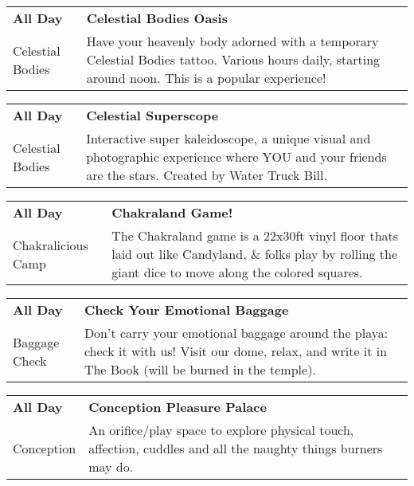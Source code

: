 \begin{tabular}{ p{1in} p{2.2in} }
    \textbf{All Day} & \textbf{Celestial Bodies Oasis} \\
    Celestial Bodies \newline  & Have your heavenly body adorned with a temporary Celestial Bodies tattoo. Various hours daily, starting around noon. This is a popular experience! \\
    \hline 
\end{tabular}
    
\begin{tabular}{ p{1in} p{2.2in} }
    \textbf{All Day} & \textbf{Celestial Superscope} \\
    Celestial Bodies \newline  & Interactive super kaleidoscope, a unique visual and photographic experience where YOU and your friends are the stars. Created by Water Truck Bill. \\
    \hline 
\end{tabular}
    
\begin{tabular}{ p{1in} p{2.2in} }
    \textbf{All Day} & \textbf{Chakraland Game!} \\
    Chakralicious Camp \newline  & The Chakraland game is a 22x30ft vinyl floor thats laid out like Candyland, \& folks play by rolling the giant dice to move along the colored squares. \\
    \hline 
\end{tabular}
    
\begin{tabular}{ p{1in} p{2.2in} }
    \textbf{All Day} & \textbf{Check Your Emotional Baggage} \\
    Baggage Check \newline  & Don't carry your emotional baggage around the playa: check it with us! Visit our dome, relax, and write it in The Book (will be burned in the temple). \\
    \hline 
\end{tabular}
    
\begin{tabular}{ p{1in} p{2.2in} }
    \textbf{All Day} & \textbf{Conception Pleasure Palace} \\
    Conception \newline  & An orifice/play space to explore physical touch, affection, cuddles and all the naughty things burners may do. \\
    \hline 
\end{tabular}
    
